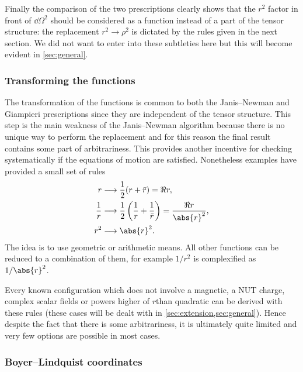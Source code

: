 Finally the comparison of the two prescriptions clearly shows that the $r^2$ factor in front of $\dd\Omega^2$ should be considered as a function instead of a part of the tensor structure: the replacement $r^2 \to \rho^2$ is dictated by the rules given in the next section.
We did not want to enter into these subtleties here but this will become evident in \cref{sec:general}.



\subsubsection{Transforming the functions}


The transformation of the functions is common to both the Janis--Newman and Giampieri prescriptions since they are independent of the tensor structure.
This step is the main weakness of the Janis--Newman algorithm because there is no unique way to perform the replacement and for this reason the final result contains some part of arbitrariness.
This provides another incentive for checking systematically if the equations of motion are satisfied.
Nonetheless examples have provided a small set of rules~\cite{Newman:1965:NoteKerrSpinningParticle, Newman:1965:MetricRotatingCharged, Drake:2000:UniquenessNewmanJanisAlgorithm, Erbin:2015:JanisNewmanAlgorithmSimplifications}
\begin{subequations}
\label{algo:eq:rules}
\begin{align}
	r & \longrightarrow \frac{1}{2} (r + \bar r) = \Re r, \\
	\frac{1}{r} & \longrightarrow \frac{1}{2} \left(\frac{1}{r} + \frac{1}{\bar r}\right) = \frac{\Re r}{\abs{r}^2}, \\
	r^2 & \longrightarrow \abs{r}^2.
\end{align}
\end{subequations}
The idea is to use geometric or arithmetic means.
All other functions can be reduced to a combination of them, for example $1 / r^2$ is complexified as $1 / \abs{r}^2$.

Every known configuration which does not involve a magnetic, a NUT charge, complex scalar fields or powers higher of $r$than quadratic can be derived with these rules (these cases will be dealt with in \cref{sec:extension,sec:general}).
Hence despite the fact that there is some arbitrariness, it is ultimately quite limited and very few options are possible in most cases.


\subsubsection{Boyer--Lindquist coordinates}


